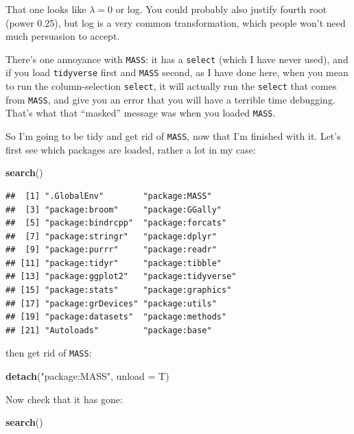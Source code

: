 \documentclass[]{tufte-book}
\newenvironment{Shaded}{}{}
\newcommand{\DataTypeTok}[1]{\textcolor[rgb]{0.56,0.13,0.00}{#1}}
\newcommand{\KeywordTok}[1]{\textcolor[rgb]{0.00,0.44,0.13}{\textbf{#1}}}
\newcommand{\NormalTok}[1]{#1}
\newcommand{\StringTok}[1]{\textcolor[rgb]{0.25,0.44,0.63}{#1}}
\theoremstyle{definition}
\theoremstyle{definition}
\theoremstyle{definition}
\theoremstyle{remark}
\begin{document}
That one looks like \(\lambda=0\) or log. You could probably also
justify fourth root (power 0.25), but log is a very common
transformation, which people won't need much persuasion to accept.

There's one annoyance with \texttt{MASS}: it has a \texttt{select}
(which I have never used), and if you load \texttt{tidyverse} first and
\texttt{MASS} second, as I have done here, when you mean to run the
column-selection \texttt{select}, it will actually run the
\texttt{select} that comes from \texttt{MASS}, and give you an error
that you will have a terrible time debugging. That's what that
``masked'' message was when you loaded \texttt{MASS}.

So I'm going to be tidy and get rid of \texttt{MASS}, now that I'm
finished with it. Let's first see which packages are loaded, rather a
lot in my case:

\begin{Shaded}
\begin{Highlighting}[]
\KeywordTok{search}\NormalTok{()}
\end{Highlighting}
\end{Shaded}

\begin{verbatim}
##  [1] ".GlobalEnv"        "package:MASS"     
##  [3] "package:broom"     "package:GGally"   
##  [5] "package:bindrcpp"  "package:forcats"  
##  [7] "package:stringr"   "package:dplyr"    
##  [9] "package:purrr"     "package:readr"    
## [11] "package:tidyr"     "package:tibble"   
## [13] "package:ggplot2"   "package:tidyverse"
## [15] "package:stats"     "package:graphics" 
## [17] "package:grDevices" "package:utils"    
## [19] "package:datasets"  "package:methods"  
## [21] "Autoloads"         "package:base"
\end{verbatim}

then get rid of \texttt{MASS}:

\begin{Shaded}
\begin{Highlighting}[]
\KeywordTok{detach}\NormalTok{(}\StringTok{"package:MASS"}\NormalTok{, }\DataTypeTok{unload =}\NormalTok{ T)}
\end{Highlighting}
\end{Shaded}

Now check that it has gone:

\begin{Shaded}
\begin{Highlighting}[]
\KeywordTok{search}\NormalTok{()}
\end{Highlighting}
\end{Shaded}
\end{document}
